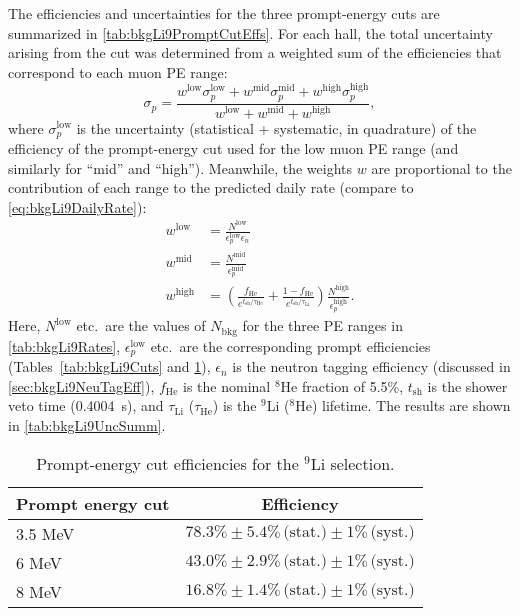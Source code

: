 \documentclass[../thesis.tex]{subfiles}
\begin{document}
The efficiencies and uncertainties for the three prompt-energy cuts are summarized in \autoref{tab:bkgLi9PromptCutEffs}. For each hall, the total uncertainty arising from the cut was determined from a weighted sum of the efficiencies that correspond to each muon PE range:
\begin{equation}
  \label{eq:bkgLi9PromptEffUnc}
  \sigma_p = \frac{w^{\mathrm{low}} \sigma_p^{\mathrm{low}} + w^{\mathrm{mid}} \sigma_p^{\mathrm{mid}} + w^{\mathrm{high}} \sigma_p^{\mathrm{high}}}{w^{\mathrm{low}} + w^{\mathrm{mid}} + w^{\mathrm{high}}},
\end{equation}
where $\sigma_p^{\mathrm{low}}$ is the uncertainty (statistical + systematic, in quadrature) of the efficiency of the prompt-energy cut used for the low muon PE range (and similarly for ``mid'' and ``high''). Meanwhile, the weights $w$ are proportional to the contribution of each range to the predicted daily rate (compare to \autoref{eq:bkgLi9DailyRate}):
\begin{equation}
  \label{eq:bkgLi9Weights}
  \begin{aligned}
    w^{\mathrm{low}} &= \frac{N^{\mathrm{low}}}{\epsilon_p^{\mathrm{low}}\epsilon_n} \\
    w^{\mathrm{mid}} &= \frac{N^{\mathrm{mid}}}{\epsilon_p^{\mathrm{mid}}} \\
    w^{\mathrm{high}} &= \left( \frac{f_{\mathrm{He}}}{e^{t_{\mathrm{sh}} / \tau_{\mathrm{He}}}} + \frac{1 - f_{\mathrm{He}}}{e^{t_{\mathrm{sh}} / \tau_{\mathrm{Li}}}} \right) \frac{N^{\mathrm{high}}}{\epsilon_p^{\mathrm{high}}}.
  \end{aligned}
\end{equation}
Here, $N^{\mathrm{low}}$ etc.\ are the values of $N_{\mathrm{bkg}}$ for the three PE ranges in \autoref{tab:bkgLi9Rates}, $\epsilon_p^{\mathrm{low}}$ etc.\ are the corresponding prompt efficiencies (Tables~\ref{tab:bkgLi9Cuts} and \ref{tab:bkgLi9PromptCutEffs}), $\epsilon_n$ is the neutron tagging efficiency (discussed in \autoref{sec:bkgLi9NeuTagEff}), $f_{\mathrm{He}}$ is the nominal $^8$He fraction of 5.5\%, $t_{\mathrm{sh}}$ is the shower veto time (0.4004~s), and $\tau_{\mathrm{Li}}$ ($\tau_{\mathrm{He}}$) is the $^9$Li ($^8$He) lifetime. The results are shown in
\autoref{tab:bkgLi9UncSumm}.

\begin{table}[h]
  \centering
  \begin{tabular}{lc}
    \toprule
    Prompt energy cut & Efficiency \\
    \midrule
    3.5 MeV & $78.3\% \pm 5.4\%\, \text{(stat.)} \pm 1\%\, \text{(syst.)}$\\
    6 MeV & $43.0\% \pm 2.9\%\, \text{(stat.)} \pm 1\%\, \text{(syst.)}$\\
    8 MeV & $16.8\% \pm 1.4\%\, \text{(stat.)} \pm 1\%\, \text{(syst.)}$\\
    \bottomrule
  \end{tabular}
  \caption{Prompt-energy cut efficiencies for the $^9$Li selection.}
  \label{tab:bkgLi9PromptCutEffs}
\end{table}
\end{document}
